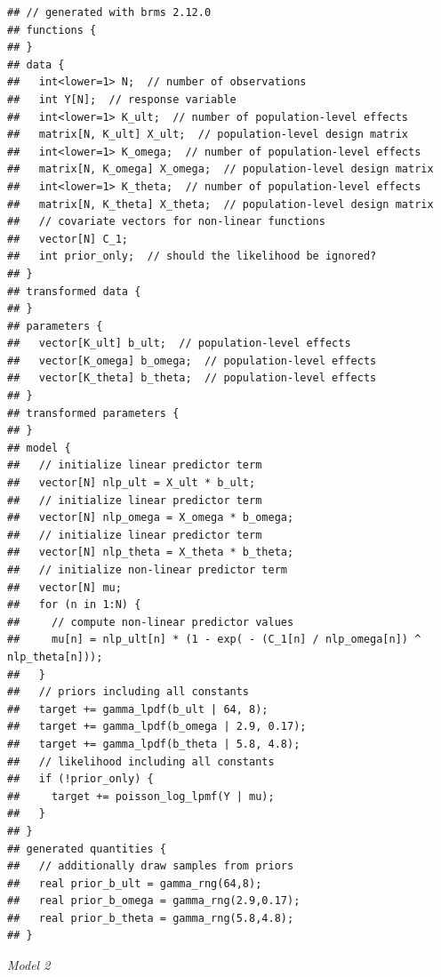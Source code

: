 \documentclass[
]{article}
\begin{document}
\begin{verbatim}
## // generated with brms 2.12.0
## functions {
## }
## data {
##   int<lower=1> N;  // number of observations
##   int Y[N];  // response variable
##   int<lower=1> K_ult;  // number of population-level effects
##   matrix[N, K_ult] X_ult;  // population-level design matrix
##   int<lower=1> K_omega;  // number of population-level effects
##   matrix[N, K_omega] X_omega;  // population-level design matrix
##   int<lower=1> K_theta;  // number of population-level effects
##   matrix[N, K_theta] X_theta;  // population-level design matrix
##   // covariate vectors for non-linear functions
##   vector[N] C_1;
##   int prior_only;  // should the likelihood be ignored?
## }
## transformed data {
## }
## parameters {
##   vector[K_ult] b_ult;  // population-level effects
##   vector[K_omega] b_omega;  // population-level effects
##   vector[K_theta] b_theta;  // population-level effects
## }
## transformed parameters {
## }
## model {
##   // initialize linear predictor term
##   vector[N] nlp_ult = X_ult * b_ult;
##   // initialize linear predictor term
##   vector[N] nlp_omega = X_omega * b_omega;
##   // initialize linear predictor term
##   vector[N] nlp_theta = X_theta * b_theta;
##   // initialize non-linear predictor term
##   vector[N] mu;
##   for (n in 1:N) {
##     // compute non-linear predictor values
##     mu[n] = nlp_ult[n] * (1 - exp( - (C_1[n] / nlp_omega[n]) ^ nlp_theta[n]));
##   }
##   // priors including all constants
##   target += gamma_lpdf(b_ult | 64, 8);
##   target += gamma_lpdf(b_omega | 2.9, 0.17);
##   target += gamma_lpdf(b_theta | 5.8, 4.8);
##   // likelihood including all constants
##   if (!prior_only) {
##     target += poisson_log_lpmf(Y | mu);
##   }
## }
## generated quantities {
##   // additionally draw samples from priors
##   real prior_b_ult = gamma_rng(64,8);
##   real prior_b_omega = gamma_rng(2.9,0.17);
##   real prior_b_theta = gamma_rng(5.8,4.8);
## }
\end{verbatim}

\newpage

\FloatBarrier

\emph{Model 2}
\end{document}
